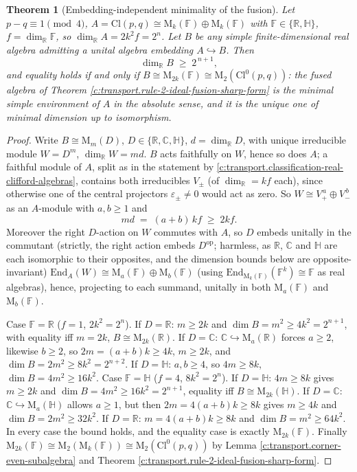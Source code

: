 \documentclass[11pt]{article}
\newtheorem{theorem}{Theorem}[section]
\theoremstyle{definition}
\theoremstyle{plain}
\newcommand{\changedmark}[2]{\marginpar{\raggedright\scriptsize\color{#1}#2}}
\providecommand{\C}{}\renewcommand{\C}{\mathbb{C}}
\providecommand{\Cl}{}\renewcommand{\Cl}{\mathrm{Cl}}
\providecommand{\HH}{}\renewcommand{\HH}{\mathbb{H}}
\providecommand{\Mat}{}\renewcommand{\Mat}{\mathrm{M}}
\providecommand{\R}{}\renewcommand{\R}{\mathbb{R}}
\begin{document}
\begin{theorem}[Embedding-independent minimality of the fusion]\label{c:transport.embedding-independent-minimality-fusion}
\changedmark{gray}{reworded}
Let $p - q \equiv 1 \pmod 4$, $A = \Cl(p,q) \cong \Mat_k(\mathbb{F}) \oplus \Mat_k(\mathbb{F})$ with $\mathbb{F} \in \{\R, \HH\}$, $f = \dim_\R \mathbb{F}$, so $\dim_\R A = 2k^2 f = 2^n$. Let $B$ be any \emph{simple} finite-dimensional real algebra admitting a unital algebra embedding $A \hookrightarrow B$. Then
\[
\dim_\R B \;\geq\; 2^{\,n+1},
\]
and equality holds if and only if $B \cong \Mat_{2k}(\mathbb{F}) \cong \Mat_2(\Cl^0(p,q))$: the fused algebra of Theorem \ref{c:transport.rule-2-ideal-fusion-sharp-form} is the minimal simple environment of $A$ in the absolute sense, and it is the unique one of minimal dimension up to isomorphism.
\end{theorem}
\begin{proof}
Write $B \cong \Mat_m(D)$, $D \in \{\R, \C, \HH\}$, $d = \dim_\R D$, with unique irreducible module $W = D^m$, $\dim_\R W = md$. $B$ acts faithfully on $W$, hence so does $A$; a faithful module of $A$, split as in the statement by \ref{c:transport.classification-real-clifford-algebras}, contains both irreducibles $V_\pm$ (of $\dim_\R = kf$ each), since otherwise one of the central projectors $\varepsilon_\pm \neq 0$ would act as zero. So $W \cong V_+^{\,a} \oplus V_-^{\,b}$ as an $A$-module with $a, b \geq 1$ and
\[
md \;=\; (a + b)\,k f \;\geq\; 2kf .
\]
Moreover the right $D$-action on $W$ commutes with $A$, so $D$ embeds unitally in the commutant (strictly, the right action embeds $D^{\mathrm{op}}$; harmless, as $\R$, $\C$ and $\HH$ are each isomorphic to their opposites, and the dimension bounds below are opposite-invariant) $\mathrm{End}_A(W) \cong \Mat_a(\mathbb{F}) \oplus \Mat_b(\mathbb{F})$ (using $\mathrm{End}_{\Mat_k(\mathbb{F})}(\mathbb{F}^k) \cong \mathbb{F}$ as real algebras), hence, projecting to each summand, unitally in both $\Mat_a(\mathbb{F})$ and $\Mat_b(\mathbb{F})$.

Case $\mathbb{F} = \R$ ($f = 1$, $2k^2 = 2^n$). If $D = \R$: $m \geq 2k$ and $\dim B = m^2 \geq 4k^2 = 2^{n+1}$, with equality iff $m = 2k$, $B \cong \Mat_{2k}(\R)$. If $D = \C$: $\C \hookrightarrow \Mat_a(\R)$ forces $a \geq 2$, likewise $b \geq 2$, so $2m = (a+b)k \geq 4k$, $m \geq 2k$, and $\dim B = 2m^2 \geq 8k^2 = 2^{n+2}$. If $D = \HH$: $a, b \geq 4$, so $4m \geq 8k$, $\dim B = 4m^2 \geq 16k^2$. Case $\mathbb{F} = \HH$ ($f = 4$, $8k^2 = 2^n$). If $D = \HH$: $4m \geq 8k$ gives $m \geq 2k$ and $\dim B = 4m^2 \geq 16k^2 = 2^{n+1}$, equality iff $B \cong \Mat_{2k}(\HH)$. If $D = \C$: $\C \hookrightarrow \Mat_a(\HH)$ allows $a \geq 1$, but then $2m = 4(a+b)k \geq 8k$ gives $m \geq 4k$ and $\dim B = 2m^2 \geq 32k^2$. If $D = \R$: $m = 4(a+b)k \geq 8k$ and $\dim B = m^2 \geq 64k^2$. In every case the bound holds, and the equality case is exactly $\Mat_{2k}(\mathbb{F})$. Finally $\Mat_{2k}(\mathbb{F}) \cong \Mat_2(\Mat_k(\mathbb{F})) \cong \Mat_2(\Cl^0(p,q))$ by Lemma \ref{c:transport.corner-even-subalgebra} and Theorem \ref{c:transport.rule-2-ideal-fusion-sharp-form}.

\end{proof}
\end{document}
